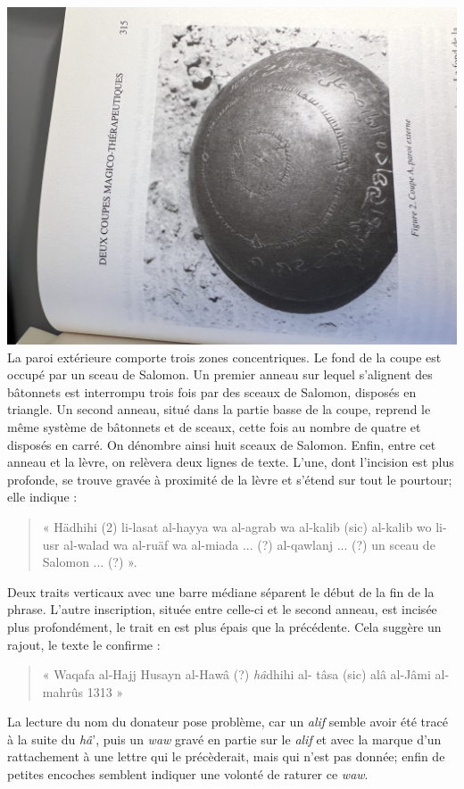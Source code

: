 \includegraphics[width=\textwidth]{HommeetIslam/Images/IMG_2456.JPG}
La paroi extérieure comporte trois zones concentriques. Le fond de la coupe est occupé par un sceau de Salomon. Un premier anneau sur lequel s'alignent des bâtonnets est interrompu trois fois par des sceaux de Salomon, disposés en triangle. Un second anneau, situé dans la partie basse de la coupe, reprend le même système de bâtonnets et de sceaux, cette fois au nombre de quatre et disposés en carré. On dénombre ainsi huit sceaux de Salomon. Enfin, entre cet anneau et la lèvre, on relèvera deux lignes de texte. L'une, dont l'incision est plus profonde, se trouve gravée à proximité de la lèvre et s'étend sur tout le pourtour; elle indique :
 \begin{quote}
     « Hädhihi (2) li-lasat al-hayya wa al-agrab wa al-kalib (sic) al-kalib wo
li-usr al-walad wa al-ruäf wa al-miada ... (?) al-qawlanj ... (?) un sceau de Salomon ... (?) ».
 \end{quote}
 Deux traits verticaux avec une barre médiane séparent le début de la fin de la phrase. L'autre inscription, située entre celle-ci et le second anneau, est incisée plus profondément, le trait en est plus épais que la précédente. Cela suggère un rajout,
le texte le confirme : 
\begin{quote}
    « Waqafa  al-Hajj Husayn al-Hawâ (?) \textit{hâ}dhihi al-
tâsa (sic) alâ al-Jâmi al-mahrûs 1313 »
\end{quote}   La lecture du nom du donateur pose problème, car un \textit{alif} semble avoir été tracé à la suite du \textit{hâ}', puis un \textit{waw} gravé en partie sur le \textit{alif} et avec la marque d'un rattachement à une lettre qui le précèderait, mais qui n'est pas donnée; enfin de petites encoches semblent indiquer une volonté de raturer ce \textit{waw}.
